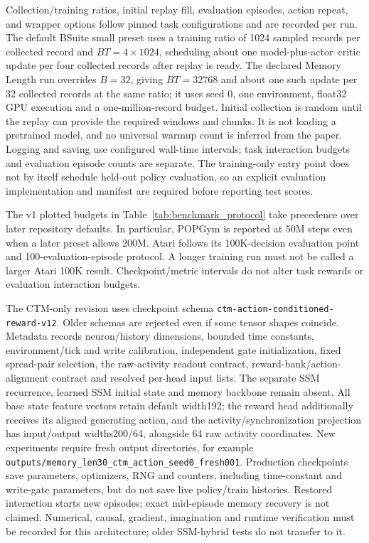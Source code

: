 \documentclass{article}
\begin{document}
Collection/training ratios, initial replay fill, evaluation episodes, action repeat, and wrapper options follow pinned task configurations and are recorded per run. The default BSuite small preset uses a training ratio of 1024 sampled records per collected record and $B T=4\times1024$, scheduling about one model-plus-actor--critic update per four collected records after replay is ready. The declared Memory Length run overrides $B=32$, giving $BT=32768$ and about one such update per 32 collected records at the same ratio; it uses seed 0, one environment, float32 GPU execution and a one-million-record budget. Initial collection is random until the replay can provide the required windows and chunks. It is not loading a pretrained model, and no universal warmup count is inferred from the paper. Logging and saving use configured wall-time intervals; task interaction budgets and evaluation episode counts are separate. The training-only entry point does not by itself schedule held-out policy evaluation, so an explicit evaluation implementation and manifest are required before reporting test scores.

The v1 plotted budgets in Table~\ref{tab:benchmark_protocol} take precedence over later repository defaults. In particular, POPGym is reported at 50M steps even when a later preset allows 200M. Atari follows its 100K-decision evaluation point and 100-evaluation-episode protocol. A longer training run must not be called a larger Atari 100K result. Checkpoint/metric intervals do not alter task rewards or evaluation interaction budgets.

The CTM-only revision uses checkpoint schema \texttt{ctm-action-conditioned-reward-v12}. Older schemas are rejected even if some tensor shapes coincide. Metadata records neuron/history dimensions, bounded time constants, environment/tick and write calibration, independent gate initialization, fixed spread-pair selection, the raw-activity readout contract, reward-bank/action-alignment contract and resolved per-head input lists. The separate SSM recurrence, learned SSM initial state and memory backbone remain absent. All base state feature vectors retain default width192; the reward head additionally receives its aligned generating action, and the activity/synchronization projection has input/output widths200/64, alongside 64 raw activity coordinates. New experiments require fresh output directories, for example \texttt{outputs/memory\_len30\_ctm\_action\_seed0\_fresh001}. Production checkpoints save parameters, optimizers, RNG and counters, including time-constant and write-gate parameters, but do not save live policy/train histories. Restored interaction starts new episodes; exact mid-episode memory recovery is not claimed. Numerical, causal, gradient, imagination and runtime verification must be recorded for this architecture; older SSM-hybrid tests do not transfer to it.
\end{document}
